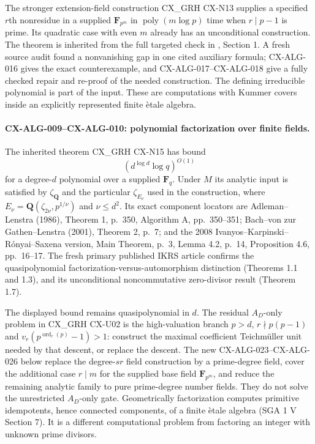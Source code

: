 \documentclass[11pt,a4paper]{article}
\begin{document}
The stronger extension-field construction CX\_GRH CX-N13 supplies a specified
$r$th nonresidue in a supplied $\mathbf F_{p^m}$ in
$\operatorname{poly}(m\log p)$ time when $r\mid p-1$ is prime. Its quadratic
case with even $m$ already has an unconditional construction. The theorem is
inherited from the full targeted check in
, Section 1. A fresh source audit
found a nonvanishing gap in one cited auxiliary formula; CX-ALG-016 gives
the exact counterexample, and CX-ALG-017--CX-ALG-018 give a fully checked
repair and re-proof of the needed construction. The defining
irreducible polynomial is part of the input. These are computations with
Kummer covers inside an explicitly represented finite \`etale algebra.

\paragraph{CX-ALG-009--CX-ALG-010: polynomial factorization over finite fields.}
The inherited theorem CX\_GRH CX-N15 has bound
\[
                 (d^{\log d}\log q)^{O(1)}
\]
for a degree-$d$ polynomial over a supplied $\mathbf F_q$. Under $M$ its
analytic input is satisfied by $\zeta_{\mathbf Q}$ and the particular
$\zeta_{E_\nu}$ used in the construction, where
$E_\nu=\mathbf Q(\zeta_{2\nu},p^{1/\nu})$ and $\nu\leq d^2$.
Its exact component locators are Adleman--Lenstra (1986), Theorem 1, p.~350,
Algorithm A, pp.~350--351; Bach--von zur Gathen--Lenstra (2001), Theorem 2,
p.~7; and the 2008 Ivanyos--Karpinski--R\'onyai--Saxena version, Main Theorem,
p.~3, Lemma 4.2, p.~14, Proposition 4.6, pp.~16--17.
The fresh primary published IKRS article confirms the quasipolynomial
factorization-versus-automorphism distinction (Theorems 1.1 and 1.3), and
its unconditional noncommutative zero-divisor result (Theorem 1.7).

The displayed bound remains quasipolynomial in $d$. The residual $A_D$-only
problem in CX\_GRH CX-U02 is the high-valuation branch
$p>d$, $r\nmid p(p-1)$ and
$v_r(p^{\operatorname{ord}_r(p)}-1)>1$: construct the maximal coefficient
Teichm\"uller unit needed by that descent, or replace the descent. The new
CX-ALG-023--CX-ALG-026 below replace the degree-$sr$ field construction by
a prime-degree field, cover the additional case $r\mid m$ for the supplied
base field $\mathbf F_{p^m}$, and reduce the remaining analytic family to
pure prime-degree number fields. They do not solve the unrestricted
$A_D$-only gate. Geometrically factorization computes
primitive idempotents, hence connected components, of a finite \`etale
algebra (SGA 1 V Section 7). It is a different computational problem from
factoring an integer with unknown prime divisors.
\end{document}
